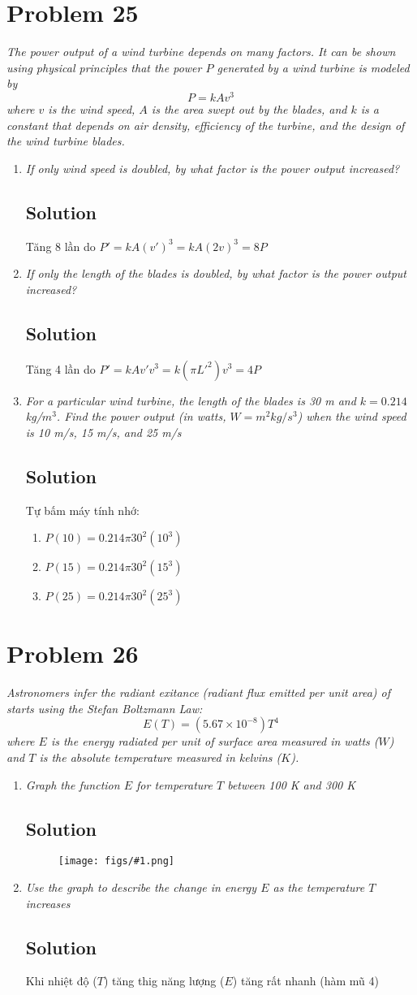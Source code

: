 \documentclass[11pt]{article}
\newcommand{\soln}{\subsection*}
\newcommand{\qn}{\textit}
\newcommand{\imgsoln}[1]{
	\begin{figure}[H]
		\centering
		\texttt{[image: figs/\#1.png]}
	\end{figure}
}
\begin{document}
\section*{Problem 25}

\qn{The power output of a wind turbine depends on many factors. It can be shown using physical principles that the power $P$ generated by a wind turbine is modeled by $$P=kAv^3$$ where $v$ is the wind speed, $A$ is the area swept out by the blades, and $k$ is a constant that depends on air density, efficiency of the turbine, and the design of the wind turbine blades.}

\begin{enumerate}
	\item \qn{If only wind speed is doubled, by what factor is the power output increased?}
	\soln{Solution}
	Tăng 8 lần do $P'=kA(v')^3=kA(2v)^3=8P$
	
	\item \qn{If only the length of the blades is doubled, by what factor is the power output increased?}
	\soln{Solution}
	Tăng 4 lần do $P'=kAv'v^3=k(\pi L'^2)v^3=4P$
	
	\item \qn{For a particular wind turbine, the length of the blades is 30 m and $k=0.214$ kg/$m^3$. Find the power output (in watts, $W=m^2kg/s^3$) when the wind speed is 10 m/s, 15 m/s, and 25 m/s}
	\soln{Solution}
	Tự bấm máy tính nhớ:
	\begin{enumerate}
		\item $P(10)=0.214\pi30^2(10^3)$
		\item $P(15)=0.214\pi30^2(15^3)$
		\item $P(25)=0.214\pi30^2(25^3)$
	\end{enumerate}
\end{enumerate}

\section*{Problem 26}

\qn{Astronomers infer the radiant exitance (radiant flux emitted per unit area) of starts using the Stefan Boltzmann Law: $$E(T)=(5.67 \times 10^{-8})T^4$$ where $E$ is the energy radiated per unit of surface area measured in watts ($W$) and $T$ is the absolute temperature measured in kelvins ($K$).}

\begin{enumerate}
	\item \qn{Graph the function $E$ for temperature $T$ between 100 K and 300 K}
	\soln{Solution}
	\imgsoln{1.2.26-ans.a}
	
	\item \qn{Use the graph to describe the change in energy $E$ as the temperature $T$ increases}
	\soln{Solution}
	Khi nhiệt độ ($T$) tăng thig năng lượng ($E$) tăng rất nhanh (hàm mũ 4)
\end{enumerate}
\end{document}
